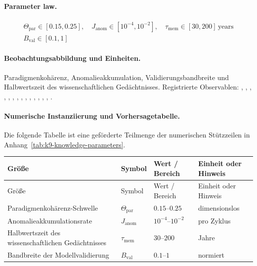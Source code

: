 \paragraph{Parameter law.}
\[
\begin{gathered} \Theta_{\mathrm{par}} \in [0.15,0.25],\quad J_{\mathrm{anom}} \in [10^{-4},10^{-2}],\quad \tau_{\mathrm{mem}} \in [30,200]\,\mathrm{years} \\ B_{\mathrm{val}} \in [0.1,1] \end{gathered}
\]

\paragraph{Beobachtungsabbildung und Einheiten.}
Paradigmenkohärenz, Anomalieakkumulation, Validierungsbandbreite und Halbwertszeit des wissenschaftlichen Gedächtnisses.
Registrierte Observablen: , \allowbreak {}, \allowbreak {}, \allowbreak {}, \allowbreak {}, \allowbreak {}, \allowbreak {}, \allowbreak {}, \allowbreak {}, \allowbreak {}, \allowbreak {}, \allowbreak {}, \allowbreak {}, \allowbreak {}, \allowbreak {}.

\paragraph{Numerische Instanziierung und Vorhersagetabelle.}
Die folgende Tabelle ist eine geförderte Teilmenge der numerischen Stützzeilen in Anhang~\ref{tab:k9-knowledge-parameters}.
\begin{longtable}{@{}L{0.27\textwidth}L{0.15\textwidth}L{0.24\textwidth}L{0.16\textwidth}@{}}
\toprule
Größe & Symbol & Wert / Bereich & Einheit oder Hinweis \\
\midrule
\endfirsthead
\toprule
Größe & Symbol & Wert / Bereich & Einheit oder Hinweis \\
\midrule
\endhead
Paradigmenkohärenz-Schwelle & $\scriptstyle \Theta_{\mathrm{par}}$ & $0.15\text{--}0.25$ & dimensionslos \\
Anomalieakkumulationsrate & $\scriptstyle J_{\mathrm{anom}}$ & $10^{-4}\text{--}10^{-2}$ & pro Zyklus \\
Halbwertszeit des wissenschaftlichen Gedächtnisses & $\scriptstyle \tau_{\mathrm{mem}}$ & $30\text{--}200$ & Jahre \\
Bandbreite der Modellvalidierung & $\scriptstyle B_{\mathrm{val}}$ & $0.1\text{--}1$ & normiert \\
\bottomrule
\end{longtable}

